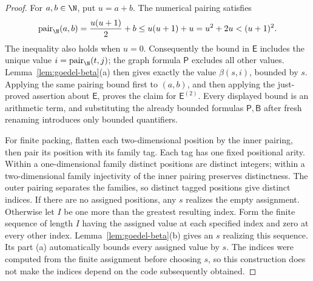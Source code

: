 \begin{proof}
For \(a,b\in\N\), put \(u=a+b\).  The numerical pairing satisfies
\[
 \operatorname{pair}_{\N}(a,b)
 =\frac{u(u+1)}2+b
 \leq u(u+1)+u
 =u^2+2u<(u+1)^2.
\]
The inequality also holds when \(u=0\).  Consequently the bound in
\(\mathsf E\) includes the unique value
\(i=\operatorname{pair}_{\N}(t,j)\); the graph formula
\(\mathsf P\) excludes all other values.  Lemma~\ref{lem:goedel-beta}(a)
then gives exactly the value \(\beta(s,i)\), bounded by \(s\).
Applying the same pairing bound first to \((a,b)\), and then applying
the just-proved assertion about \(\mathsf E\), proves the claim for
\(\mathsf E^{(2)}\).  Every displayed bound is an arithmetic term,
and substituting the already bounded formulas \(\mathsf P,\mathsf B\)
after fresh renaming introduces only bounded quantifiers.

For finite packing, flatten each two-dimensional position by the inner
pairing, then pair its position with its family tag.  Each tag has one
fixed positional arity.  Within a one-dimensional family distinct positions
are distinct integers; within a two-dimensional family injectivity of the
inner pairing preserves distinctness.  The outer pairing separates the
families, so distinct tagged positions give distinct indices.  If there are no
assigned positions, any \(s\) realizes the empty assignment.  Otherwise
let \(I\) be one more than the greatest resulting index.  Form the
finite sequence of length \(I\) having the assigned value at each
specified index and zero at every other index.  Lemma~\ref{lem:goedel-beta}(b)
gives an \(s\) realizing this sequence.  Its part (a) automatically
bounds every assigned value by \(s\).  The indices were computed from
the finite assignment before choosing \(s\), so this construction
does not make the indices depend on the code subsequently obtained.
\end{proof}

